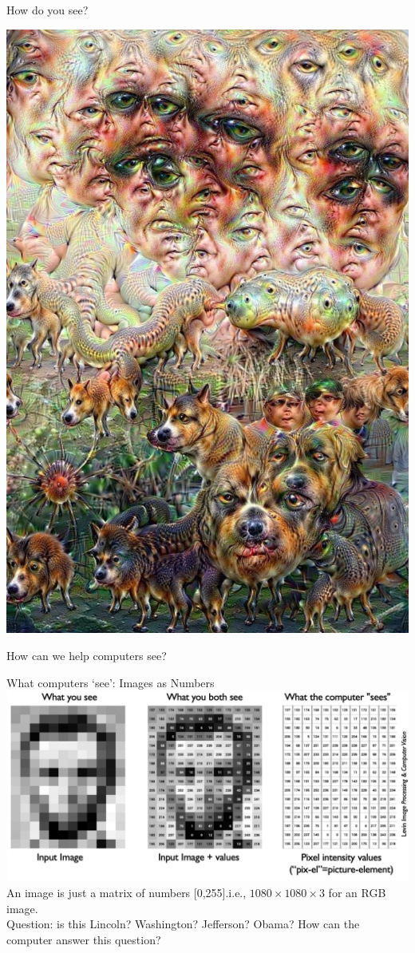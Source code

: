 \documentclass[serif, aspectratio=169]{beamer}
\begin{document}
\begin{frame}{How do you see?}
\begin{center}
			\includegraphics[keepaspectratio, scale=0.25]{pic/nothing.PNG}
		\end{center}
		How can we help computers see?
	\end{frame}
	\begin{frame}{What computers ‘see’: Images as Numbers}
		\centering
		\includegraphics[keepaspectratio, scale=0.35]{pic/what.png}
		\\{An image is just a matrix of numbers [0,255].i.e., $1080 \times 1080 \times 3$ for an RGB image.\\ Question: is this Lincoln? Washington? Jefferson? Obama?
			How can the computer answer this question?}
	\end{frame}
\end{document}
